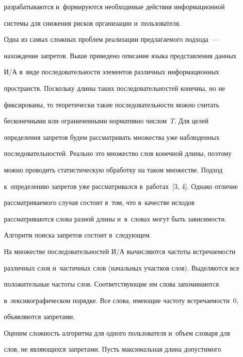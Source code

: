 разрабатываются и~формируются необходимые действия информационной 


системы для снижения рисков организации и~пользователя.


  


  Одна из самых сложных проблем реализации предлагаемого подхода~--- 


на\-хож\-де\-ние запретов. Выше приведено описание языка представления данных 


И\!/\!А в~виде последовательности элементов различных информационных 


пространств. Поскольку длины таких последовательностей конечны, но не 


фиксированы, то теоретически такие последовательности можно считать 


бесконечными или ограниченными нормативно числом~$T$. Для целей 


определения запретов будем рассматривать множества уже наблюденных 


последовательностей. Реально это множество слов конечной длины, поэтому 


можно проводить статистическую обработку на таком множестве. Подход 


к~определению запретов уже рассматривался в~работах~[3, 4]. Однако отличие 


рассматриваемого случая состоит в~том, что в~качестве исходов 


рассматриваются слова разной длины и~в~словах могут быть зависимости. 


Алгоритм поиска запретов состоит в~следующем.


  


  На множестве последовательностей И\!/\!А вычисляются частоты встре\-ча\-емости 


различных слов и~частичных слов (начальных участков слов). Выделяются все 


положительные частоты слов. Соответствующие им слова запоминаются 


в~лексикографическом порядке. Все слова, имеющие частоту встречаемости~0, 


объявляются запретами.


  


  Оценим сложность алгоритма для одного пользователя и~объем словаря для 


слов, не являющихся запретами. Пусть максимальная длина допустимого 


